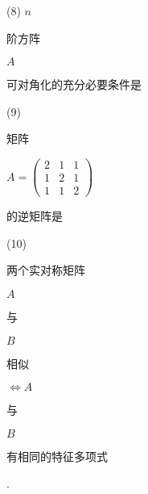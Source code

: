 \documentclass[10pt]{article}
\begin{document}
(8) $n$ \begin{CJK}{UTF8}{mj}阶方阵\end{CJK} $A$ \begin{CJK}{UTF8}{mj}可对角化的充分必要条件是\end{CJK}

(9) \begin{CJK}{UTF8}{mj}矩阵\end{CJK} $A=\left(\begin{array}{lll}2 & 1 & 1 \\ 1 & 2 & 1 \\ 1 & 1 & 2\end{array}\right)$ \begin{CJK}{UTF8}{mj}的逆矩阵是\end{CJK}

(10) \begin{CJK}{UTF8}{mj}两个实对称矩阵\end{CJK} $A$ \begin{CJK}{UTF8}{mj}与\end{CJK} $B$ \begin{CJK}{UTF8}{mj}相似\end{CJK} $\Leftrightarrow A$ \begin{CJK}{UTF8}{mj}与\end{CJK} $B$ \begin{CJK}{UTF8}{mj}有相同的特征多项式\end{CJK}.
\end{document}
